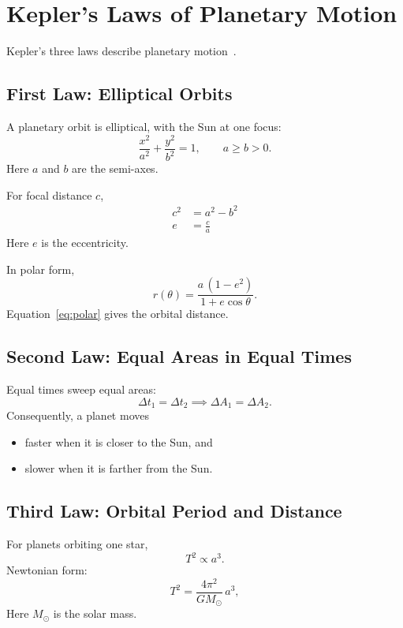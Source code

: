 \documentclass[10pt]{article}
\begin{document}
\section{Kepler's Laws of Planetary Motion}
Kepler's three laws describe planetary motion~\cite{nasa-kepler}.

\subsection{First Law: Elliptical Orbits}
A planetary orbit is elliptical, with the Sun at one focus:
\begin{equation}
  \frac{x^{2}}{a^{2}} + \frac{y^{2}}{b^{2}} = 1,
  \qquad a \ge b > 0 .
\end{equation}
Here $a$ and $b$ are the semi-axes.

For focal distance $c$,
\begin{equation}
  \begin{aligned}
    c^{2} &= a^{2} - b^{2} \\
    e     &= \frac{c}{a}
  \end{aligned}
\end{equation}
Here $e$ is the eccentricity.

In polar form,
\begin{equation}
  r(\theta) = \frac{a\,(1 - e^{2})}{1 + e\cos\theta}.
  \label{eq:polar}
\end{equation}
Equation~\eqref{eq:polar} gives the orbital distance.

\subsection{Second Law: Equal Areas in Equal Times}
Equal times sweep equal areas:
\begin{equation}
  \Delta t_{1} = \Delta t_{2}
  \implies
  \Delta A_{1} = \Delta A_{2}.
\end{equation}
Consequently, a planet moves
\begin{itemize}[label=$\diamond$]
  \item faster when it is closer to the Sun, and
  \item slower when it is farther from the Sun.
\end{itemize}

\subsection{Third Law: Orbital Period and Distance}
For planets orbiting one star,
\begin{equation}
  T^{2} \propto a^{3}.
\end{equation}
Newtonian form:
\[
  T^{2} = \frac{4\pi^{2}}{G M_{\odot}}\, a^{3},
\]
Here $M_{\odot}$ is the solar mass.
\end{document}
